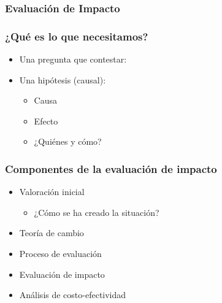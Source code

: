 \documentclass[10pt, aspectratio=169, compress]{beamer}
\begin{document}
\begin{frame}
	\frametitle{Evaluación de Impacto}

	\begin{center}
	\end{center}
\end{frame}
\begin{frame}
	\frametitle{¿Qué es lo que necesitamos?}

	\begin{itemize}
		\item Una pregunta que contestar:
		\item Una hipótesis (causal):
		
		\begin{itemize}
			\item Causa
			\item Efecto
			\item ¿Quiénes y cómo?
		\end{itemize}
	\end{itemize} 

\end{frame}
\begin{frame}
	\frametitle{Componentes de la evaluación de impacto}

	 \begin{itemize}
		 \item Valoración inicial
		 \begin{itemize}
			 \item ¿Cómo se ha creado la situación?
		 \end{itemize}
		 \item Teoría de cambio
		 \item Proceso de evaluación
		 \item Evaluación de impacto
		 \item Análisis de costo-efectividad
	 \end{itemize}

\end{frame}
\end{document}
